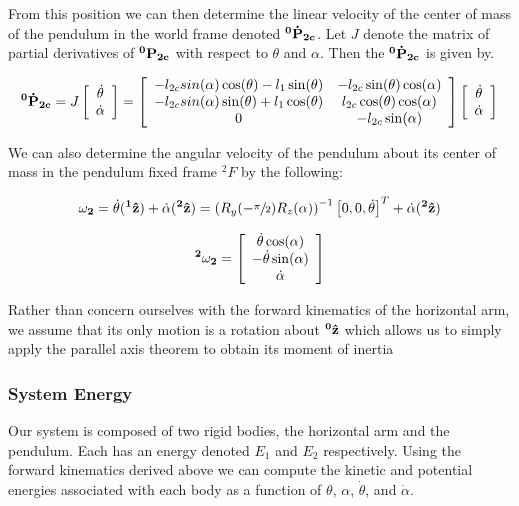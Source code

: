 \documentclass{article}
\theoremstyle{plain}
\theoremstyle{definition}
\theoremstyle{remark}
\begin{document}
From this position we can then determine the linear velocity of the center of mass of the pendulum in the world frame denoted $\bf{^0\dot{P}_{2c}}$.  Let $J$ denote the matrix of partial derivatives of $\bf{^0P_{2c}}$ with respect to $\theta$ and $\alpha$.  Then the $\bf{^0\dot{P}_{2c}}$ is given by.

$$ {\bf{^0\dot{P}_{2c}}} = J \left[ \begin{array}{c l} \dot{\theta} \\ \dot{\alpha} \end{array} \right] = \left[ \begin{array}{c c l} 
	-l_{2c} sin(\alpha) \cos(\theta) - l_{1} \sin(\theta)  &  -l_{2c} \sin(\theta) \cos(\alpha) \\
	-l_{2c} sin(\alpha) \sin(\theta) + l_1 \cos(\theta) & l_{2c} \cos(\theta) \cos(\alpha) \\
	0 & -l_{2c} \sin(\alpha) \\ \end{array} \right] \left[ \begin{array}{c l} \dot{\theta} \\ \dot{\alpha} \end{array} \right]$$

We can also determine the angular velocity of the pendulum about its center of mass in the pendulum fixed frame $^2F$  by the following:

$$ {\bf{\omega_{2}}}= \dot{\theta} ({\bf{^1\hat{z}}}) + \dot{\alpha}({\bf{^2\hat{z}}})  = \left( R_{y}(-\sfrac{\pi}{2}) R_{z}(\alpha)\right)^{-1} \left[ 0, 0, \dot{\theta} \right]^T + \dot{\alpha}({\bf{^2\hat{z}}})$$

$$  {\bf{^2\omega_{2}}}= \left[ \begin{array}{c l}   \dot{\theta} \cos(\alpha) \\ -\dot{\theta} \sin(\alpha) \\ \dot{\alpha} \end{array} \right]$$

Rather than concern ourselves with the forward kinematics of the horizontal arm, we assume that its only motion is a rotation about $\bf{^0\hat{z}}$ which allows us to simply apply the parallel axis theorem to obtain its moment of inertia 


\subsubsection*{System Energy}

Our system is composed of two rigid bodies, the horizontal arm and the pendulum.  Each has an energy denoted $E_1$ and $E_2$ respectively.  Using the forward kinematics derived above we can compute the kinetic and potential energies associated with each body as a function of $\theta$, $\alpha$, $\dot{\theta}$, and $\dot{\alpha}$.
\end{document}
